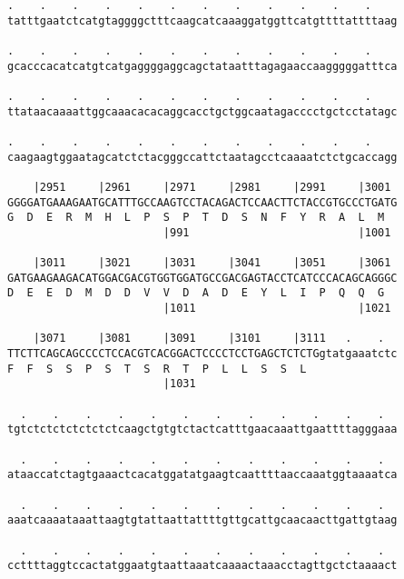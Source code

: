 \documentclass{article}
\begin{document}
\begin{Verbatim}
.    .    .    .    .    .    .    .    .    .    .    .    
tatttgaatctcatgtaggggctttcaagcatcaaaggatggttcatgttttattttaag
                                                            
.    .    .    .    .    .    .    .    .    .    .    .    
gcacccacatcatgtcatgaggggaggcagctataatttagagaaccaagggggatttca
                                                            
.    .    .    .    .    .    .    .    .    .    .    .    
ttataacaaaattggcaaacacacaggcacctgctggcaatagacccctgctcctatagc
                                                            
.    .    .    .    .    .    .    .    .    .    .    .    
caagaagtggaatagcatctctacgggccattctaatagcctcaaaatctctgcaccagg
                                                            
    |2951     |2961     |2971     |2981     |2991     |3001 
GGGGATGAAAGAATGCATTTGCCAAGTCCTACAGACTCCAACTTCTACCGTGCCCTGATG
G  D  E  R  M  H  L  P  S  P  T  D  S  N  F  Y  R  A  L  M  
                        |991                          |1001 
  
    |3011     |3021     |3031     |3041     |3051     |3061 
GATGAAGAAGACATGGACGACGTGGTGGATGCCGACGAGTACCTCATCCCACAGCAGGGC
D  E  E  D  M  D  D  V  V  D  A  D  E  Y  L  I  P  Q  Q  G  
                        |1011                         |1021 
  
    |3071     |3081     |3091     |3101     |3111   .    .  
TTCTTCAGCAGCCCCTCCACGTCACGGACTCCCCTCCTGAGCTCTCTGgtatgaaatctc
F  F  S  S  P  S  T  S  R  T  P  L  L  S  S  L              
                        |1031                               
  
  .    .    .    .    .    .    .    .    .    .    .    .  
tgtctctctctctctctcaagctgtgtctactcatttgaacaaattgaattttagggaaa
                                                            
  .    .    .    .    .    .    .    .    .    .    .    .  
ataaccatctagtgaaactcacatggatatgaagtcaattttaaccaaatggtaaaatca
                                                            
  .    .    .    .    .    .    .    .    .    .    .    .  
aaatcaaaataaattaagtgtattaattattttgttgcattgcaacaacttgattgtaag
                                                            
  .    .    .    .    .    .    .    .    .    .    .    .  
ccttttaggtccactatggaatgtaattaaatcaaaactaaacctagttgctctaaaact
                                                            

\end{Verbatim}
\end{document}
